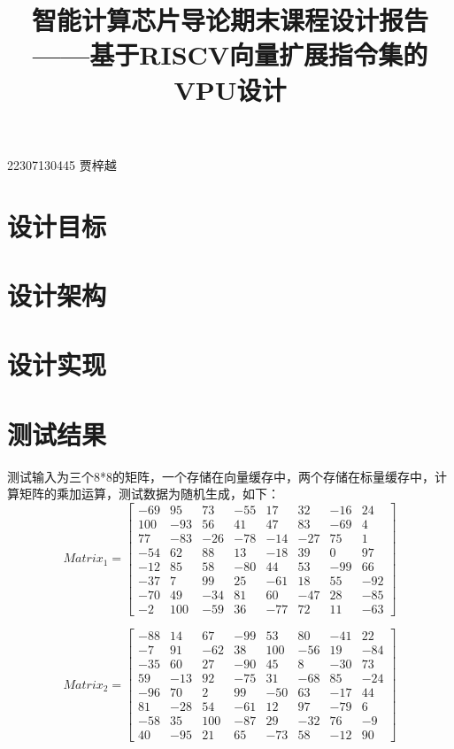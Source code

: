 \documentclass[UTF8]{ctexart}
\begin{document}
\title{智能计算芯片导论期末课程设计报告——基于RISCV向量扩展指令集的VPU设计}
\maketitle
\begin{center}
	22307130445 贾梓越
\end{center}

\section{设计目标}

\section{设计架构}

\section{设计实现}

\section{测试结果}
测试输入为三个8*8的矩阵，一个存储在向量缓存中，两个存储在标量缓存中，计算矩阵的乘加运算，测试数据为随机生成，如下：
\begin{equation}
Matrix_1
=
\left[
\begin{array}{cccccccc}
    -69 & 95  & 73  & -55 & 17  & 32  & -16 & 24  \\
    100 & -93 & 56  & 41  & 47  & 83  & -69 & 4   \\
    77  & -83 & -26 & -78 & -14 & -27 & 75  & 1   \\
    -54 & 62  & 88  & 13  & -18 & 39  & 0   & 97  \\
    -12 & 85  & 58  & -80 & 44  & 53  & -99 & 66  \\
    -37 & 7   & 99  & 25  & -61 & 18  & 55  & -92 \\
    -70 & 49  & -34 & 81  & 60  & -47 & 28  & -85 \\
    -2  & 100 & -59 & 36  & -77 & 72  & 11  & -63 
\end{array}
\right]
\end{equation}

\begin{equation}
Matrix_2
=
\left[
\begin{array}{cccccccc}
    -88 & 14  & 67  & -99 & 53  & 80  & -41 & 22  \\
    -7  & 91  & -62 & 38  & 100 & -56 & 19  & -84 \\
    -35 & 60  & 27  & -90 & 45  & 8   & -30 & 73  \\
    59  & -13 & 92  & -75 & 31  & -68 & 85  & -24 \\
    -96 & 70  & 2   & 99  & -50 & 63  & -17 & 44  \\
    81  & -28 & 54  & -61 & 12  & 97  & -79 & 6   \\
    -58 & 35  & 100 & -87 & 29  & -32 & 76  & -9  \\
    40  & -95 & 21  & 65  & -73 & 58  & -12 & 90
\end{array}
\right]
\end{equation}
\end{document}
